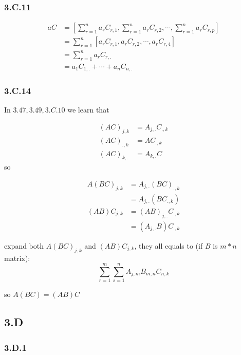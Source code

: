\subsubsection*{3.C.11}

\begin{equation*}
    \begin{split}
aC &= [\sum_{r=1}^{n}a_{r}C_{r,1}, \sum_{r=1}^{n}a_{r}C_{r,2},\cdots, \sum_{r=1}^{n}a_{r}C_{r,p}] \\
&= \sum_{r=1}^{n}[a_{r}C_{r,1}, a_{r}C_{r,2}, \cdots, a_{r}C_{r,4}] \\
&= \sum_{r=1}^{n}a_{r}C_{r,.} \\
&= a_{1}C_{1,.} +\cdots + a_{n}C_{n,.}
\end{split}
\end{equation*}

\subsubsection*{3.C.14}

In $3.47,3.49, 3.C.10$ we learn that

\begin{equation*}
    \begin{split}
(AC)_{j,k} &= A_{j,.}C_{.,k} \\
(AC)_{.,k} &= AC_{.,k} \\
(AC)_{k,.} &= A_{k,.}C
\end{split}
\end{equation*}
so 

\begin{equation*}
    \begin{split}
    A(BC)_{j,k} &= A_{j,.}(BC)_{.,k} \\
    & = A_{j,.}(BC_{.,k}) \\
    (AB)C_{j,k} &= (AB)_{j,.}C_{.,k} \\
     &= (A_{j,.}B)C_{.,k}
\end{split}
\end{equation*}

expand both $A(BC)_{j,k}$ and $(AB)C_{j,k}$, they all equals to (if $B$ is $m*n$ matrix):
\[\sum_{r=1}^{m}\sum_{s=1}^{n}A_{j,m}B_{m,n}C_{n,k}\]

so $A(BC) = (AB)C$

\subsection*{3.D}
\subsubsection*{3.D.1}

